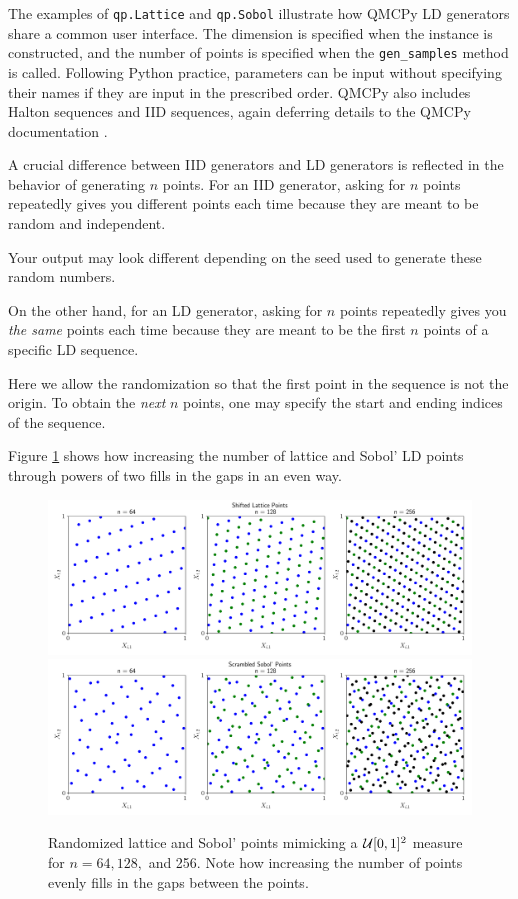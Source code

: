 \documentclass[graybox,footinfo]{svmult}
\begin{document}
The examples of \texttt{qp.Lattice} and \texttt{qp.Sobol} illustrate how QMCPy LD generators share a common user interface.  The dimension is specified when the instance is constructed, and the number of points is specified when the \texttt{gen\_samples} method is called.  Following Python practice, parameters can be input without specifying their names if they are input in the prescribed order.  QMCPy also includes Halton sequences and IID sequences, again deferring details to the QMCPy documentation \cite{QMCPyDocs}.

A crucial difference between IID generators and LD generators is reflected in the behavior of generating $n$ points.  For an IID generator, asking for $n$ points repeatedly gives you different points each time because they are meant to be random and independent.

Your output may look different depending on the seed used to generate these random numbers.

On the other hand, for an LD generator, asking for $n$ points repeatedly gives you \emph{the same} points each time because they are meant to be the first $n$ points of a specific LD sequence.  

Here we allow the randomization so that the first point in the sequence is not the origin.  To obtain the \emph{next} $n$ points, one may specify the start and ending indices of the sequence.


Figure \ref{fig:increase_n} shows how increasing the number of lattice and Sobol' LD points through powers of two fills in the gaps in an even way.

\begin{figure}[t]
	\includegraphics[width=1\textwidth]{QMCSoftwareArticle/figs/dd_lattice_successive.png}
	\qquad
	\includegraphics[width=1\textwidth]{QMCSoftwareArticle/figs/dd_sobol_successive.png}
	\caption{Randomized lattice and Sobol' points mimicking a ${\mathcal{U}}[0,1]^2$ measure for $n = 64, 128,$ and 256. Note how increasing the number of points evenly fills in the gaps between the points.}
	\label{fig:increase_n}
\end{figure}
\end{document}
